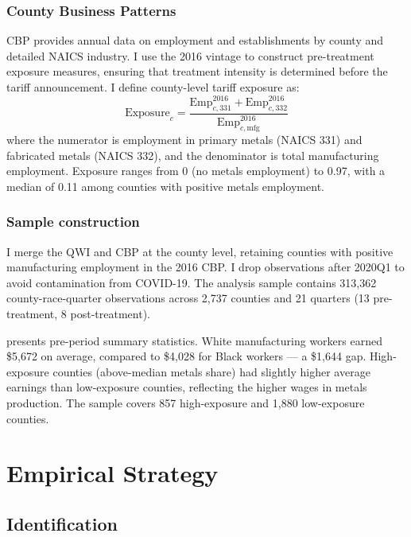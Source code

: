 \documentclass[12pt]{article}
\begin{document}
\subsubsection*{County Business Patterns} CBP provides annual data on employment and establishments by county and detailed NAICS industry. I use the 2016 vintage to construct pre-treatment exposure measures, ensuring that treatment intensity is determined before the tariff announcement. I define county-level tariff exposure as:
\begin{equation}
\text{Exposure}_c = \frac{\text{Emp}_{c,331}^{2016} + \text{Emp}_{c,332}^{2016}}{\text{Emp}_{c,\text{mfg}}^{2016}}
\end{equation}
where the numerator is employment in primary metals (NAICS 331) and fabricated metals (NAICS 332), and the denominator is total manufacturing employment. Exposure ranges from 0 (no metals employment) to 0.97, with a median of 0.11 among counties with positive metals employment.

\subsubsection*{Sample construction} I merge the QWI and CBP at the county level, retaining counties with positive manufacturing employment in the 2016 CBP. I drop observations after 2020Q1 to avoid contamination from COVID-19. The analysis sample contains 313,362 county-race-quarter observations across 2,737 counties and 21 quarters (13 pre-treatment, 8 post-treatment).



 presents pre-period summary statistics. White manufacturing workers earned \$5,672 on average, compared to \$4,028 for Black workers --- a \$1,644 gap. High-exposure counties (above-median metals share) had slightly higher average earnings than low-exposure counties, reflecting the higher wages in metals production. The sample covers 857 high-exposure and 1,880 low-exposure counties.


\section{Empirical Strategy}

\subsection{Identification}
\end{document}
